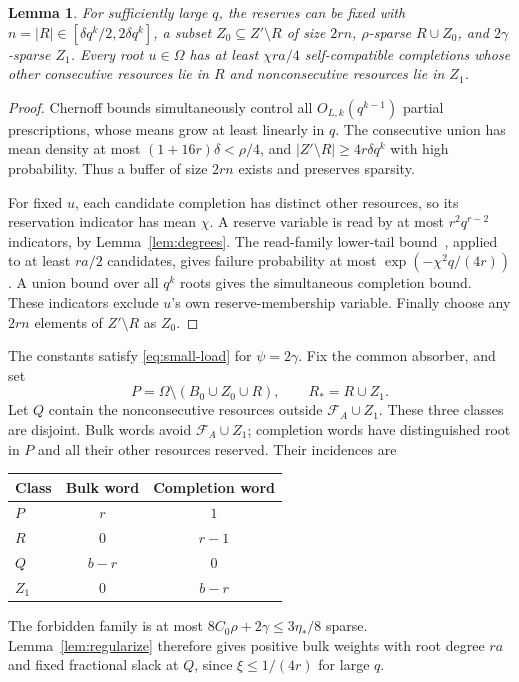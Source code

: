 \documentclass[12pt,letterpaper,onecolumn]{article}
\newtheorem{lemma}[theorem]{Lemma}
\theoremstyle{definition}
\newcommand{\cF}{\mathcal F}
\begin{document}
\begin{lemma}\label{lem:reserves}
For sufficiently large $q$, the reserves can be fixed with $n=|R|\in[\delta q^k/2,2\delta q^k]$, a subset $Z_0\subseteq Z'\setminus R$ of size $2rn$, $\rho$-sparse $R\cup Z_0$, and $2\gamma$-sparse $Z_1$. Every root $u\in\Omega$ has at least $\chi ra/4$ self-compatible completions whose other consecutive resources lie in $R$ and nonconsecutive resources lie in $Z_1$.
\end{lemma}
\begin{proof}
Chernoff bounds simultaneously control all $O_{L,k}(q^{k-1})$ partial prescriptions, whose means grow at least linearly in $q$. The consecutive union has mean density at most $(1+16r)\delta<\rho/4$, and $|Z'\setminus R|\ge4r\delta q^k$ with high probability. Thus a buffer of size $2rn$ exists and preserves sparsity.

For fixed $u$, each candidate completion has distinct other resources, so its reservation indicator has mean $\chi$. A reserve variable is read by at most $r^2q^{r-2}$ indicators, by Lemma~\ref{lem:degrees}. The read-family lower-tail bound~\cite[Theorem 1.1]{gavinsky2015}, applied to at least $ra/2$ candidates, gives failure probability at most $\exp(-\chi^2q/(4r))$. A union bound over all $q^k$ roots gives the simultaneous completion bound. These indicators exclude $u$'s own reserve-membership variable. Finally choose any $2rn$ elements of $Z'\setminus R$ as $Z_0$.
\end{proof}

The constants satisfy \eqref{eq:small-load} for $\psi=2\gamma$. Fix the common absorber, and set
\[
 P=\Omega\setminus(B_0\cup Z_0\cup R),\qquad R_*=R\cup Z_1.
\]
Let $Q$ contain the nonconsecutive resources outside $\cF_A\cup Z_1$. These three classes are disjoint. Bulk words avoid $\cF_A\cup Z_1$; completion words have distinguished root in $P$ and all their other resources reserved. Their incidences are
\begin{center}
\begin{tabular}{@{}lcc@{}}
\toprule
Class & Bulk word & Completion word\\
\midrule
$P$ & $r$ & $1$\\
$R$ & $0$ & $r-1$\\
$Q$ & $b-r$ & $0$\\
$Z_1$ & $0$ & $b-r$\\
\bottomrule
\end{tabular}
\end{center}
The forbidden family is at most $8C_0\rho+2\gamma\le3\eta_*/8$ sparse. Lemma~\ref{lem:regularize} therefore gives positive bulk weights with root degree $ra$ and fixed fractional slack at $Q$, since $\xi\le1/(4r)$ for large $q$.
\end{document}
